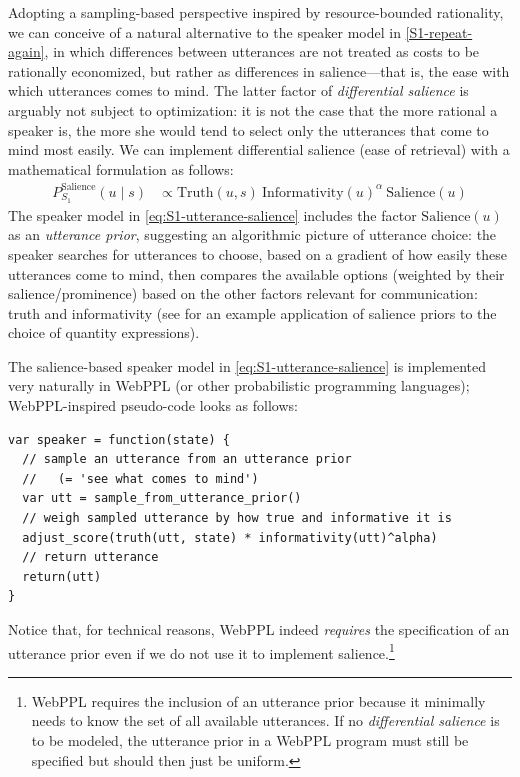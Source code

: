 \documentclass{sp}
\begin{document}
Adopting a sampling-based perspective inspired by resource-bounded rationality, we can conceive of a natural alternative to the speaker model in \eqref{S1-repeat-again}, in which differences between utterances are not treated as costs to be rationally economized, but rather as differences in salience---that is, the ease with which utterances comes to mind.
The latter factor of \emph{differential salience} is arguably not subject to optimization: it is not the case that the more rational a speaker is, the more she would tend to select only the utterances that come to mind most easily.
We can implement differential salience (ease of retrieval) with a mathematical formulation as follows:
%
\begin{align}
  \label{eq:S1-utterance-salience}
  P_{S_1}^{\text{Salience}}(u\mid s)   & \propto \text{Truth}(u,s) \ \text{Informativity}(u)^{\alpha} \ \text{Salience}(u)
\end{align}
%
The speaker model in \eqref{eq:S1-utterance-salience} includes the factor $\text{Salience}(u)$ as an \emph{utterance prior}, suggesting an algorithmic picture of utterance choice: the speaker searches for utterances to choose, based on a gradient of how easily these utterances come to mind, then compares the available options (weighted by their salience/prominence) based on the other factors relevant for communication: truth and informativity (see \citealp{Tielvan-TielFranke2021:Probabilistic-p} for an example application of salience priors to the choice of quantity expressions).

The salience-based speaker model in \eqref{eq:S1-utterance-salience} is implemented very naturally in WebPPL (or other probabilistic programming languages); WebPPL-inspired pseudo-code looks as follows:
\begin{lstlisting}
var speaker = function(state) {
  // sample an utterance from an utterance prior
  //   (= 'see what comes to mind')
  var utt = sample_from_utterance_prior()
  // weigh sampled utterance by how true and informative it is
  adjust_score(truth(utt, state) * informativity(utt)^alpha)
  // return utterance
  return(utt)
}
\end{lstlisting}
Notice that, for technical reasons, WebPPL indeed \emph{requires} the specification of an utterance prior even if we do not use it to implement salience.\footnote{WebPPL requires the inclusion of an utterance prior because it minimally needs to know the set of all available utterances. If no \emph{differential salience} is to be modeled, the utterance prior in a WebPPL program must still be specified but should then just be uniform.}
\end{document}

